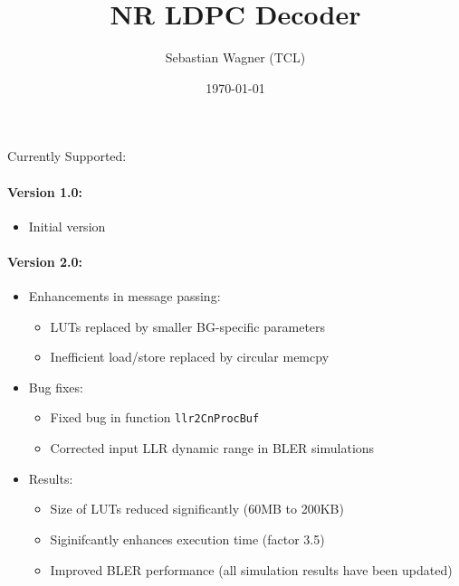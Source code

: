 \documentclass{article}
\title{NR LDPC Decoder}
\author{Sebastian Wagner (TCL)}
\date{\today}
\begin{document}
\maketitle



\begin{center}Currently Supported:\end{center}

\paragraph{Version 1.0:}
\begin{itemize}
\item Initial version
\end{itemize}

\paragraph{Version 2.0:}
\begin{itemize}
\item Enhancements in message passing:
  \begin{itemize}
  \item LUTs replaced by smaller BG-specific parameters
  \item Inefficient load/store replaced by circular memcpy
  \end{itemize}
\item Bug fixes:
  \begin{itemize}
  \item Fixed bug in function \texttt{llr2CnProcBuf}
  \item Corrected input LLR dynamic range in BLER simulations
  \end{itemize}
\item Results:
  \begin{itemize}
  \item Size of LUTs reduced significantly (60MB to 200KB)
  \item Siginifcantly enhances execution time (factor 3.5)
  \item Improved BLER performance (all simulation results have been updated)
  \end{itemize}
\end{itemize}
\end{document}
